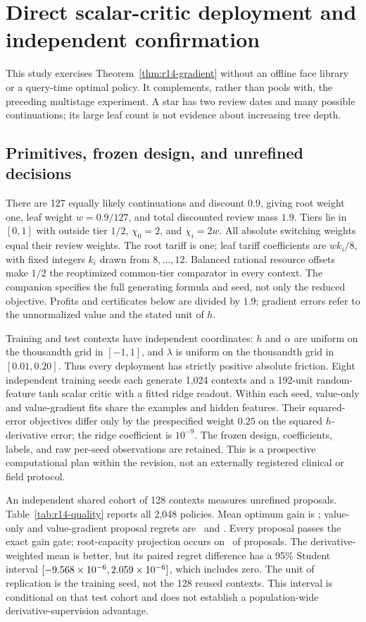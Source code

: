 \section{Direct scalar-critic deployment and independent confirmation}\label{sec:r14-experiment}
This study exercises Theorem~\ref{thm:r14-gradient} without an offline face library or a query-time optimal policy. It complements, rather than pools with, the preceding multistage experiment. A star has two review dates and many possible continuations; its large leaf count is not evidence about increasing tree depth.

\subsection{Primitives, frozen design, and unrefined decisions}
There are 127 equally likely continuations and discount $0.9$, giving root weight one, leaf weight $w=0.9/127$, and total discounted review mass $1.9$. Tiers lie in $[0,1]$ with outside tier $1/2$, $\chi_0=2$, and $\chi_i=2w$. All absolute switching weights equal their review weights. The root tariff is one; leaf tariff coefficients are $w k_i/8$, with fixed integers $k_i$ drawn from $8,\ldots,12$. Balanced rational resource offsets make $1/2$ the reoptimized common-tier comparator in every context. The companion specifies the full generating formula and seed, not only the reduced objective. Profits and certificates below are divided by $1.9$; gradient errors refer to the unnormalized value and the stated unit of $h$.

Training and test contexts have independent coordinates: $h$ and $\alpha$ are uniform on the thousandth grid in $[-1,1]$, and $\lambda$ is uniform on the thousandth grid in $[0.01,0.20]$. Thus every deployment has strictly positive absolute friction. Eight independent training seeds each generate 1,024 contexts and a 192-unit random-feature tanh scalar critic with a fitted ridge readout. Within each seed, value-only and value-gradient fits share the examples and hidden features. Their squared-error objectives differ only by the prespecified weight $0.25$ on the squared $h$-derivative error; the ridge coefficient is $10^{-9}$. The frozen design, coefficients, labels, and raw per-seed observations are retained. This is a prospective computational plan within the revision, not an externally registered clinical or field protocol.

An independent shared cohort of 128 contexts measures unrefined proposals. Table~\ref{tab:r14-quality} reports all 2,048 policies. Mean optimum gain is \RFourteenOptimalGain; value-only and value-gradient proposal regrets are \RFourteenValueRegret\ and \RFourteenGradientRegret. Every proposal passes the exact gain gate; root-capacity projection occurs on \RFourteenCapRate\ of proposals. The derivative-weighted mean is better, but its paired regret difference has a 95\% Student interval $[-9.568\times10^{-6},2.059\times10^{-6}]$, which includes zero. The unit of replication is the training seed, not the 128 reused contexts. This interval is conditional on that test cohort and does not establish a population-wide derivative-supervision advantage.


